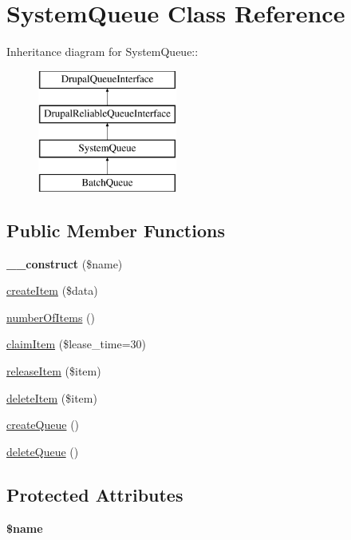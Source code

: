 \hypertarget{classSystemQueue}{
\section{SystemQueue Class Reference}
\label{classSystemQueue}
}
Inheritance diagram for SystemQueue::\begin{figure}[H]
\begin{center}
\leavevmode
\includegraphics[height=4cm]{classSystemQueue}
\end{center}
\end{figure}
\subsection*{Public Member Functions}
\begin{DoxyCompactItemize}
\item 
\hypertarget{classSystemQueue_add089667e3ee829e1ae3bd8c50167fb4}{
{\bfseries \_\-\_\-construct} (\$name)}
\label{classSystemQueue_add089667e3ee829e1ae3bd8c50167fb4}

\item 
\hyperlink{classSystemQueue_abf9ce9dc71e435f3fc0471e2187730a3}{createItem} (\$data)
\item 
\hyperlink{classSystemQueue_af5df5ad6fbfde21170f2e03115a7f7da}{numberOfItems} ()
\item 
\hyperlink{classSystemQueue_aa5f774d4ef4b31f1318751d9b9872071}{claimItem} (\$lease\_\-time=30)
\item 
\hyperlink{classSystemQueue_aac7e2e13e33ebba60d4594b3de6a22df}{releaseItem} (\$item)
\item 
\hyperlink{classSystemQueue_a868c037c23889db59acfeadc5d30c6f9}{deleteItem} (\$item)
\item 
\hyperlink{classSystemQueue_a92bade740b59032aced46cfcbfaaeed6}{createQueue} ()
\item 
\hyperlink{classSystemQueue_a28faefc0b81477b2dbfa1434236f3bb5}{deleteQueue} ()
\end{DoxyCompactItemize}
\subsection*{Protected Attributes}
\begin{DoxyCompactItemize}
\item 
\hypertarget{classSystemQueue_ab4d1830d006026ae87b4d6604cc1e4e1}{
{\bfseries \$name}}
\label{classSystemQueue_ab4d1830d006026ae87b4d6604cc1e4e1}

\end{DoxyCompactItemize}


